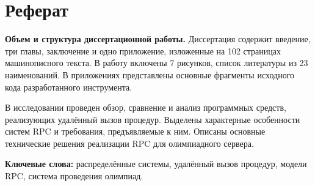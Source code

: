 \chapter*{Реферат}
\textbf{Объем и структура диссертационной работы.}
Диссертация содержит введение, три главы, заключение и одно приложение,
изложенные на 102 страницах машинописного текста.
В работу включены 7 рисунков,
список литературы из 23 наименований.
В приложениях представлены основные фрагменты исходного кода
разработанного инструмента.

В исследовании проведен обзор, сравнение и анализ программных средств,
реализующих удалённый вызов процедур.
Выделены характерные особенности систем RPC и требования, предъявляемые к ним.
Описаны основные технические решения реализации RPC для олимпиадного сервера.



\textbf{Ключевые слова:}
распределённые системы,
удалённый вызов процедур,
модели RPC,
система проведения олимпиад.

